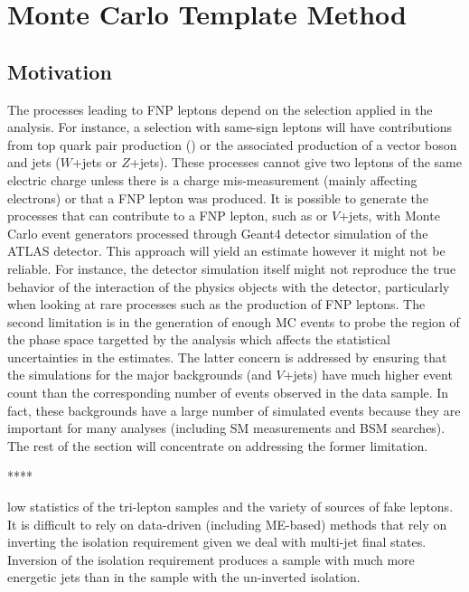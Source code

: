 \section{Monte Carlo Template Method}
\graphicspath{{figures/mct/}}

\subsection{Motivation}
The processes leading to FNP leptons depend on the selection applied in the analysis. For instance, a selection with same-sign leptons 
will have contributions from top quark pair production (\ttbar) or the associated production of a vector boson and jets 
($W$+jets or $Z$+jets).%
These processes cannot give two leptons of the same electric charge unless there is a charge mis-measurement (mainly affecting electrons) 
or that a FNP lepton was produced. It is possible to generate the processes that can contribute to a FNP lepton, such as \ttbar or 
$V$+jets, with Monte Carlo event generators processed through Geant4 detector simulation of the ATLAS detector.  
This approach will yield an estimate however it might not be reliable. For instance, the detector simulation itself might not 
reproduce the true behavior of the interaction of the physics objects with the detector, particularly when looking at rare processes 
such as the production of FNP leptons. The second limitation is in the generation of enough MC events to probe the region of the 
phase space targetted by the analysis which affects the statistical uncertainties in the estimates.
The latter concern is addressed by ensuring that the simulations for the major backgrounds (\ttbar and $V$+jets) have much 
higher event count than the corresponding number of events observed in the data sample.
In fact, these backgrounds have a large number of simulated events because they are important for many analyses 
(including SM measurements and BSM searches).
The rest of the section will concentrate on addressing the former limitation. 

****


low statistics of the tri-lepton samples and the variety of sources of fake leptons.
It is difficult to rely on data-driven (including ME-based) methods that rely on inverting the isolation requirement given we deal with multi-jet final states. Inversion of the isolation requirement produces a sample with much more energetic jets than in the sample with the un-inverted isolation. 

